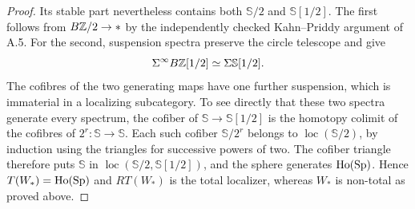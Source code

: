 \begin{proof}
Its stable part nevertheless contains both $\mathbb S/2$ and $\mathbb S[1/2]$. The first follows from $B\mathbb Z/2\to *$ by the independently checked Kahn--Priddy argument of A.5. For the second, suspension spectra preserve the circle telescope and give
\[
 \Sigma^\infty B\mathbb Z[1/2]\simeq\Sigma\mathbb S[1/2].
\]
The cofibres of the two generating maps have one further suspension, which is immaterial in a localizing subcategory. To see directly that these two spectra generate every spectrum, the cofiber of $\mathbb S\to\mathbb S[1/2]$ is the homotopy colimit of the cofibres of $2^r:\mathbb S\to\mathbb S$. Each such cofiber $\mathbb S/2^r$ belongs to $\operatorname{loc}(\mathbb S/2)$, by induction using the triangles for successive powers of two. The cofiber triangle therefore puts $\mathbb S$ in $\operatorname{loc}(\mathbb S/2,\mathbb S[1/2])$, and the sphere generates $\operatorname{Ho}(\mathrm{Sp})$. Hence $T(W_*)=\operatorname{Ho}(\mathrm{Sp})$ and $RT(W_*)$ is the total localizer, whereas $W_*$ is non-total as proved above.
\end{proof}

